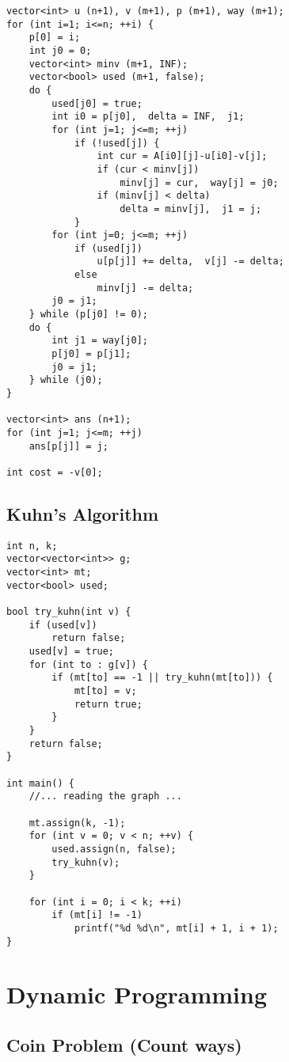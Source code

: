 \documentclass[10pt]{article}
\begin{document}
\begin{multicols*}{2}
\begin{lstlisting}[style=compactcpp]
vector<int> u (n+1), v (m+1), p (m+1), way (m+1);
for (int i=1; i<=n; ++i) {
    p[0] = i;
    int j0 = 0;
    vector<int> minv (m+1, INF);
    vector<bool> used (m+1, false);
    do {
        used[j0] = true;
        int i0 = p[j0],  delta = INF,  j1;
        for (int j=1; j<=m; ++j)
            if (!used[j]) {
                int cur = A[i0][j]-u[i0]-v[j];
                if (cur < minv[j])
                    minv[j] = cur,  way[j] = j0;
                if (minv[j] < delta)
                    delta = minv[j],  j1 = j;
            }
        for (int j=0; j<=m; ++j)
            if (used[j])
                u[p[j]] += delta,  v[j] -= delta;
            else
                minv[j] -= delta;
        j0 = j1;
    } while (p[j0] != 0);
    do {
        int j1 = way[j0];
        p[j0] = p[j1];
        j0 = j1;
    } while (j0);
}

vector<int> ans (n+1);
for (int j=1; j<=m; ++j)
    ans[p[j]] = j;

int cost = -v[0];
\end{lstlisting}

\subsection{Kuhn's Algorithm}

\begin{lstlisting}[style=compactcpp]
int n, k;
vector<vector<int>> g;
vector<int> mt;
vector<bool> used;

bool try_kuhn(int v) {
    if (used[v])
        return false;
    used[v] = true;
    for (int to : g[v]) {
        if (mt[to] == -1 || try_kuhn(mt[to])) {
            mt[to] = v;
            return true;
        }
    }
    return false;
}

int main() {
    //... reading the graph ...

    mt.assign(k, -1);
    for (int v = 0; v < n; ++v) {
        used.assign(n, false);
        try_kuhn(v);
    }

    for (int i = 0; i < k; ++i)
        if (mt[i] != -1)
            printf("%d %d\n", mt[i] + 1, i + 1);
}
\end{lstlisting}

\section{Dynamic Programming}

\subsection{Coin Problem (Count ways)}


\end{multicols*}
\end{document}
